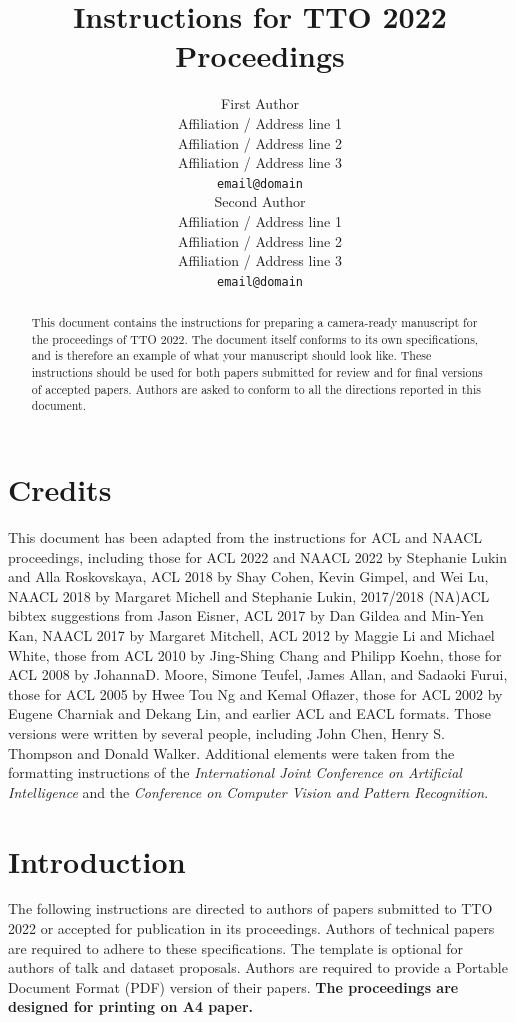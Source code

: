\documentclass[11pt,a4paper]{article}
\title{Instructions for TTO 2022 Proceedings}
\author{First Author \\
  Affiliation / Address line 1 \\
  Affiliation / Address line 2 \\
  Affiliation / Address line 3 \\
  \texttt{email@domain} \\\And
  Second Author \\
  Affiliation / Address line 1 \\
  Affiliation / Address line 2 \\
  Affiliation / Address line 3 \\
  \texttt{email@domain} \\}
\date{}
\begin{document}
\maketitle
\begin{abstract}
  This document contains the instructions for preparing a camera-ready
  manuscript for the proceedings of TTO 2022. The document itself
  conforms to its own specifications, and is therefore an example of
  what your manuscript should look like. These instructions should be
  used for both papers submitted for review and for final versions of
  accepted papers.  Authors are asked to conform to all the directions
  reported in this document.
\end{abstract}

\section{Credits}

This document has been adapted from the instructions
for ACL and NAACL proceedings,
including 
those for
ACL 2022 and
NAACL 2022 by Stephanie Lukin and Alla Roskovskaya, 
ACL 2018 by Shay Cohen, Kevin Gimpel, and Wei Lu, 
NAACL 2018 by Margaret Michell and Stephanie Lukin,
2017/2018 (NA)ACL bibtex suggestions from Jason Eisner,
ACL 2017 by Dan Gildea and Min-Yen Kan, 
NAACL 2017 by Margaret Mitchell, 
ACL 2012 by Maggie Li and Michael White, 
those from ACL 2010 by Jing-Shing Chang and Philipp Koehn, 
those for ACL 2008 by JohannaD. Moore, Simone Teufel, James Allan, and Sadaoki Furui, 
those for ACL 2005 by Hwee Tou Ng and Kemal Oflazer, 
those for ACL 2002 by Eugene Charniak and Dekang Lin, 
and earlier ACL and EACL formats.
Those versions were written by several
people, including John Chen, Henry S. Thompson and Donald
Walker. Additional elements were taken from the formatting
instructions of the \emph{International Joint Conference on Artificial
  Intelligence} and the \emph{Conference on Computer Vision and
  Pattern Recognition}.

\section{Introduction}

The following instructions are directed to authors of papers submitted
to TTO 2022 or accepted for publication in its proceedings. Authors of technical papers
are required to adhere to these specifications. The template is optional for 
authors of talk and dataset proposals. Authors are
required to provide a Portable Document Format (PDF) version of their
papers. \textbf{The proceedings are designed for printing on A4
paper.}
\end{document}
